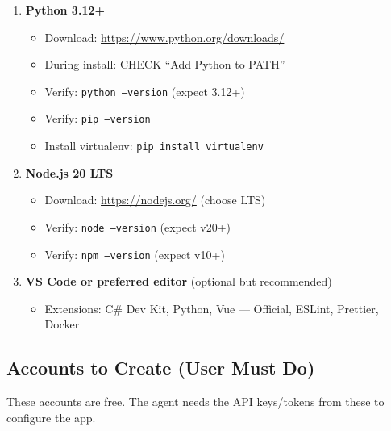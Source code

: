 \documentclass[12pt,letterpaper]{article}
\begin{document}
\begin{enumerate}
  \item \textbf{Python 3.12+}
  \begin{itemize}
    \item Download: \url{https://www.python.org/downloads/}
    \item During install: CHECK ``Add Python to PATH''
    \item Verify: \texttt{python --version} (expect 3.12+)
    \item Verify: \texttt{pip --version}
    \item Install virtualenv: \texttt{pip install virtualenv}
  \end{itemize}

  \item \textbf{Node.js 20 LTS}
  \begin{itemize}
    \item Download: \url{https://nodejs.org/} (choose LTS)
    \item Verify: \texttt{node --version} (expect v20+)
    \item Verify: \texttt{npm --version} (expect v10+)
  \end{itemize}

  \item \textbf{VS Code or preferred editor} (optional but recommended)
  \begin{itemize}
    \item Extensions: C\# Dev Kit, Python, Vue --- Official, ESLint, Prettier, Docker
  \end{itemize}

\end{enumerate}

\subsection{Accounts to Create (User Must Do)}

These accounts are free. The agent needs the API keys/tokens from these to configure the app.
\end{document}
